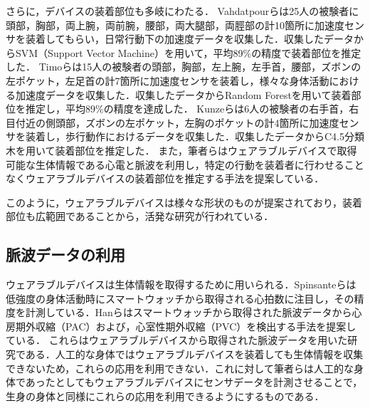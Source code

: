 \documentclass[submit,techrep]{ipsj}
\begin{document}
さらに，デバイスの装着部位も多岐にわたる．
Vahdatpourら\cite{localization_vahdatpour}は25人の被験者に頭部，胸部，両上腕，両前腕，腰部，両大腿部，両脛部の計10箇所に加速度センサを装着してもらい，日常行動下の加速度データを収集した．収集したデータからSVM（Support Vector Machine）を用いて，平均89\%の精度で装着部位を推定した．
Timoら\cite{localization_timo}は15人の被験者の頭部，胸部，左上腕，左手首，腰部，ズボンの左ポケット，左足首の計7箇所に加速度センサを装着し，様々な身体活動における加速度データを収集した．収集したデータからRandom Forestを用いて装着部位を推定し，平均89\%の精度を達成した．
Kunzeら\cite{localization_kunze}は6人の被験者の右手首，右目付近の側頭部，ズボンの左ポケット，左胸のポケットの計4箇所に加速度センサを装着し，歩行動作におけるデータを収集した．収集したデータからC4.5分類木を用いて装着部位を推定した．
また，筆者ら\cite{localization_yoshida}はウェアラブルデバイスで取得可能な生体情報である心電と脈波を利用し，特定の行動を装着者に行わせることなくウェアラブルデバイスの装着部位を推定する手法を提案している．
\par

このように，ウェアラブルデバイスは様々な形状のものが提案されており，装着部位も広範囲であることから，活発な研究が行われている．


\subsection{脈波データの利用}
ウェアラブルデバイスは生体情報を取得するために用いられる．Spinsanteら\cite{accuracy_in_low_intensity}は低強度の身体活動時にスマートウォッチから取得される心拍数に注目し，その精度を計測している．Hanら\cite{arrhythmia_detection}はスマートウォッチから取得された脈波データから心房期外収縮（PAC）および，心室性期外収縮（PVC）を検出する手法を提案している．
これらはウェアラブルデバイスから取得された脈波データを用いた研究である．人工的な身体ではウェアラブルデバイスを装着しても生体情報を収集できないため，これらの応用を利用できない．これに対して筆者らは人工的な身体であったとしてもウェアラブルデバイスにセンサデータを計測させることで，生身の身体と同様にこれらの応用を利用できるようにするものである．
\end{document}
